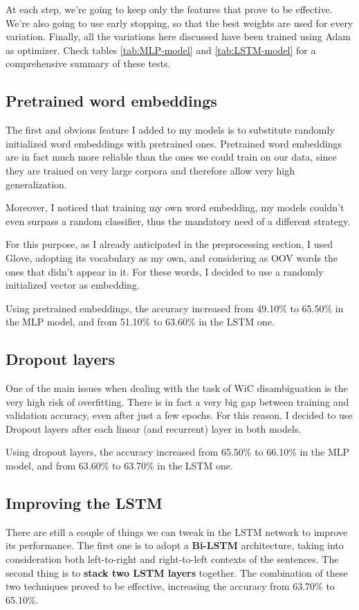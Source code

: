 \documentclass[11pt,a4paper]{article}
\begin{document}
	At each step, we're going to keep only the features that prove to be effective. We're also going to use early stopping, so that the best weights are used for every variation. Finally, all the variations here discussed have been trained using Adam \citep{kingma2017adam} as optimizer. Check tables \ref{tab:MLP-model} and \ref{tab:LSTM-model} for a comprehensive summary of these tests.
	
	\subsection{Pretrained word embeddings}
	The first and obvious feature I added to my models is to substitute randomly initialized word embeddings with pretrained ones. Pretrained word embeddings are in fact much more reliable than the ones we could train on our data, since they are trained on very large corpora and therefore allow very high generalization.
	
	Moreover, I noticed that training my own word embedding, my models couldn't even surpass a random classifier, thus the mandatory need of a different strategy.
	
	For this purpose, as I already anticipated in the preprocessing section, I used Glove, adopting its vocabulary as my own, and considering as OOV words the ones that didn't appear in it. For these words, I decided to use a randomly initialized vector as embedding.
	
	Using pretrained embeddings, the accuracy increased from 49.10\% to 65.50\% in the MLP model, and from 51.10\% to 63.60\% in the LSTM one.
	
	\subsection{Dropout layers}
	One of the main issues when dealing with the task of WiC disambiguation is the very high risk of overfitting. There is in fact a very big gap between training and validation accuracy, even after just a few epochs. For this reason, I decided to use Dropout layers \citep{JMLR:v15:srivastava14a} after each linear (and recurrent) layer in both models.
	
	Using dropout layers, the accuracy increased from 65.50\% to 66.10\% in the MLP model, and from 63.60\% to 63.70\% in the LSTM one.
	
	\subsection{Improving the LSTM}
	There are still a couple of things we can tweak in the LSTM network to improve its performance. The first one is to adopt a \textbf{Bi-LSTM} architecture, taking into consideration both left-to-right and right-to-left contexts of the sentences. The second thing is to \textbf{stack two LSTM layers} together. The combination of these two techniques proved to be effective, increasing the accuracy from 63.70\% to 65.10\%.
	
\end{document}
